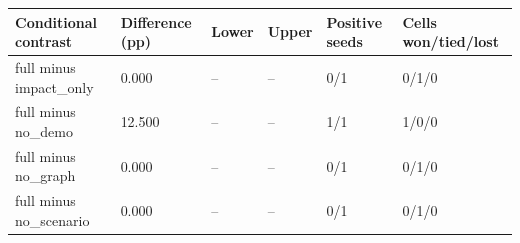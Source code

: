 \begin{tabular}{llllll}
\toprule
Conditional contrast & Difference (pp) & Lower & Upper & Positive seeds & Cells won/tied/lost\\
\midrule
full minus impact\_only & 0.000 & -- & -- & 0/1 & 0/1/0\\
full minus no\_demo & 12.500 & -- & -- & 1/1 & 1/0/0\\
full minus no\_graph & 0.000 & -- & -- & 0/1 & 0/1/0\\
full minus no\_scenario & 0.000 & -- & -- & 0/1 & 0/1/0\\
\bottomrule
\end{tabular}